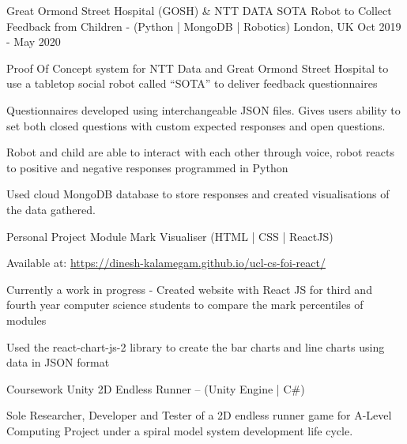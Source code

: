 
\begin{cventries}
  \cventry
    {Great Ormond Street Hospital (GOSH) \& NTT DATA} %
    {SOTA Robot to Collect Feedback from Children - (Python | MongoDB | Robotics)} %
    {London, UK} %
    {Oct 2019 - May 2020} %
    {
      \begin{cvitems} %
        \item {Proof Of Concept system for NTT Data and Great Ormond Street Hospital to use a tabletop social robot called ``SOTA'' to deliver feedback questionnaires}
        \item Questionnaires developed using interchangeable JSON files. Gives users ability to set both closed questions with custom expected responses and open questions. 
        \item{Robot and child are able to interact with each other through voice, robot reacts to positive and negative responses programmed in Python}
        \item{Used cloud MongoDB database to store responses and created visualisations of the data gathered.}
      \end{cvitems}
    }

  \cventry
  {Personal Project}
  {Module Mark Visualiser (HTML | CSS | ReactJS)}
  {}
  {}
  {
    \begin{cvitems}
      \item Available at: \href{https://dinesh-kalamegam.github.io/ucl-cs-foi-react/}{https://dinesh-kalamegam.github.io/ucl-cs-foi-react/}
      \item Currently a work in progress - Created website with React JS for third and fourth year computer science students to compare the mark percentiles of modules
      \item Used the react-chart-js-2 library to create the bar charts and line charts using data in JSON format
    \end{cvitems}
  }

  \cventry
    {Coursework}
    {Unity 2D Endless Runner – (Unity Engine | C\#)}
    {}
    {}
    {
      \begin{cvitems}
        \item Sole Researcher, Developer and Tester of a 2D endless runner game for A-Level Computing Project under a spiral model system development life cycle.
      \end{cvitems}
    }

\end{cventries}

